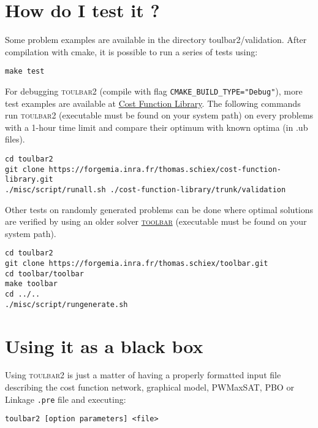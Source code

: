 \documentclass{article}
\def\toulbar2{\textsc{toulbar2}}
\def\toolbar{\textsc{toolbar}}
\begin{document}
\section{How do I test it ?}

Some problem examples are available in the directory {\sf toulbar2/validation}. After compilation with cmake, it is possible to run a series of tests using:
\begin{verbatim}
make test
\end{verbatim}

For debugging \toulbar2 (compile with flag \verb!CMAKE_BUILD_TYPE="Debug"!), more test examples are available at \href{https://forgemia.inra.fr/thomas.schiex/cost-function-library}{Cost Function Library}.
The following commands run \toulbar2 (executable must be found on your system path) on every problems with a 1-hour time limit and compare their optimum with known optima (in .ub files).
\begin{verbatim}
cd toulbar2
git clone https://forgemia.inra.fr/thomas.schiex/cost-function-library.git
./misc/script/runall.sh ./cost-function-library/trunk/validation
\end{verbatim}

Other tests on randomly generated problems can be done where optimal solutions are verified by using an older solver \href{https://forgemia.inra.fr/thomas.schiex/toolbar}{\toolbar} (executable must be found on your system path).
\begin{verbatim}
cd toulbar2
git clone https://forgemia.inra.fr/thomas.schiex/toolbar.git
cd toolbar/toolbar
make toolbar
cd ../..
./misc/script/rungenerate.sh
\end{verbatim}

\section{Using it as a black box}

Using \toulbar2 is just a matter of having a properly formatted input
file describing the cost function network, graphical model, PWMaxSAT,
PBO or Linkage \texttt{.pre} file and executing:

\begin{verbatim}
toulbar2 [option parameters] <file>
\end{verbatim}
\end{document}
